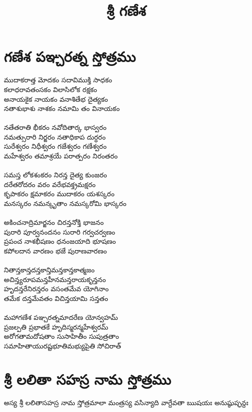 \documentclass{memoir}
\begin{document}
\title{శ్రీ గణేశ}

\maketitle

\chapter{గణేశ పఞ్చరత్న స్తోత్రము}


ముదాకరాత్త మోదకం సదావిముక్తి సాధకం \\
కలాధరావతంసకం విలాసిలోక రక్షకం \\
అనాయకైక నాయకం వనాశితేభ దైత్యకం\\
నతాశుభాశు నాశకం నమామి తం వినాయకం\\
\\
నతేతరాతి భీకరం నవోదితార్క భాస్వరం \\
నమత్సురారి నిర్జరం నతాధికాప దుర్ధరం\\
సురేశ్వరం నిధీశ్వరం గజేశ్వరం గణేశ్వరం \\
మహేశ్వరం తమాశ్రయే పరాత్పరం నిరంతరం\\
\\
సమస్త లోకశంకరం నిరన్త దైత్య కుంజరం\\
దరేతరోదరం వరం వరేభవక్త్రమక్షరం\\
కృపాకరం క్షమాకరం ముదాకరం యశస్కరం\\
మనస్కరం నమన్కృతాం నమస్కరోమి భాస్కరం\\
\\
అకించనాద్రిమార్జనం చిరన్తనోక్తి భాజనం \\
పురారి పూర్వనందనం సురారి గర్వచర్వణం \\
ప్రపంచ నాశభీషణం ధనంజయాది భూషణం \\
కపోలదాన వారణం భజే పురాణవారణం \\
\\
నితాన్తకాన్తదన్తకాన్తిమన్తకాన్తకాత్మజం \\
అచిన్త్యరూపమన్తహీనమన్తరాయకృన్తనం\\
హృదన్తరేనిరన్తరం వసంతమేవ యోగినాం\\
తమేక దన్తమేవతం విచిన్తయామి సన్తతం\\
\\
మహాగణేశ పఞ్చరత్నమాదరేణ యోన్వహమ్ \\
ప్రజల్పతి ప్రభాతకే హృదిస్మరన్మహేశ్వరమ్\\
అరోగతామదోషతాం సుసాహితీం సుపుత్రతాం \\
సమాహితాయురష్టభూతిమభ్యుపైతి సోచిరాత్\\


\chapter{శ్రీ లలితా సహస్ర నామ స్తోత్రము}

అస్య శ్రీ లలితాసహస్ర నామ స్తోత్రమాలా మంత్రస్య వసిన్యాది వాగ్దేవతా ఋషయః అనుష్ఠుప్ఛన్దః
\end{document}

